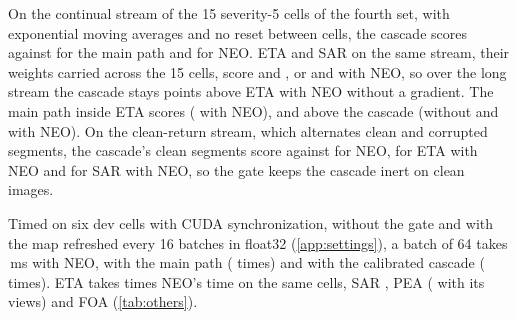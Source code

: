 \documentclass{article}
\newcommand{\neo}{NEO}
\begin{document}
On the continual stream of the 15 severity-5 cells of the fourth set, with exponential moving averages and no reset between cells, the cascade scores  against  for the main path and  for \neo{}. ETA and SAR on the same stream, their weights carried across the 15 cells, score  and , or  and  with \neo{}, so over the long stream the cascade stays  points above ETA with \neo{} without a gradient. The main path inside ETA scores  ( with \neo{}),  and  above the cascade (without and with \neo{}). On the clean-return stream, which alternates clean and corrupted segments, the cascade's clean segments score  against  for \neo{},  for ETA with \neo{} and  for SAR with \neo{}, so the gate keeps the cascade inert on clean images.

Timed on six dev cells with CUDA synchronization, without the gate and with the map refreshed every 16 batches in float32 (\cref{app:settings}), a batch of 64 takes \,ms with \neo{},  with the main path ( times) and  with the calibrated cascade ( times). ETA takes  times \neo{}'s time on the same cells, SAR , PEA  ( with its views) and FOA  (\cref{tab:others}).
\end{document}
